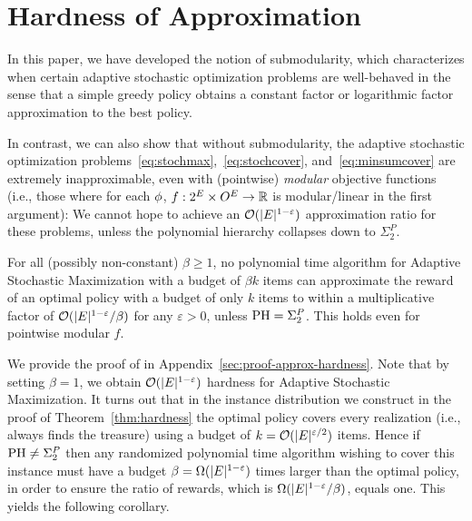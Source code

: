 %
\section{Hardness of Approximation} \label{sec:hardness}
%
In this paper, we have developed the notion of \term submodularity,
which characterizes when certain adaptive stochastic optimization
problems are well-behaved in the sense that a simple greedy policy
obtains a constant factor or logarithmic factor approximation to the
best policy.  


In contrast, we can also show that without \term submodularity, the adaptive stochastic
optimization problems~\eqref{eq:stochmax},~\eqref{eq:stochcover}, and~\eqref{eq:minsumcover} are extremely inapproximable, even with (pointwise) \emph{modular} objective functions (i.e., those where for each ${\color{black}{\ensuremath{\phi}}}$, $f:2^{E}\times O^{E}\rightarrow\mathbb{R}$ is modular/linear in the first argument): 
We cannot hope to achieve an ${\mathcal{O}}(|E|^{1-\varepsilon})$
approximation ratio for these problems, unless the polynomial hierarchy
collapses down to $\Sigma^P_2$. 

\begin{theorem} \label{thm:hardness}
For all (possibly non-constant) $\beta \ge 1$, 
no polynomial time algorithm for Adaptive Stochastic
Maximization with a budget of $\beta k$ items
can approximate the reward of an optimal policy with a budget of only $k$ items
to within a
multiplicative factor of ${\mathcal{O}}(|E|^{1-\varepsilon}/\beta)$ for any
$\varepsilon > 0$, unless $\textrm{PH} = \Sigma^P_2$. This holds even
for pointwise modular $f$.
\end{theorem}



%
We provide the proof of  in Appendix~\ref{sec:proof-approx-hardness}.
Note that by setting $\beta = 1$, we obtain ${\mathcal{O}}(|E|^{1-\varepsilon})$
hardness for Adaptive Stochastic Maximization.  
It turns out that 
in the instance distribution we construct in the
proof of Theorem~\ref{thm:hardness} the
optimal policy covers every realization (i.e., always finds the
treasure) using a budget of 
$k = {\mathcal{O}}(|E|^{\varepsilon/2})$ 
items.
Hence if $\textrm{PH} \neq \Sigma^P_2$ then 
any randomized polynomial time algorithm wishing to cover this
instance must have a budget 
$\beta = \Omega(|E|^{1-\varepsilon})$ times larger than the
optimal policy, in order to ensure the ratio of rewards, which is
$\Omega(|E|^{1-\varepsilon}/\beta)$, equals one.
This yields the following corollary.


